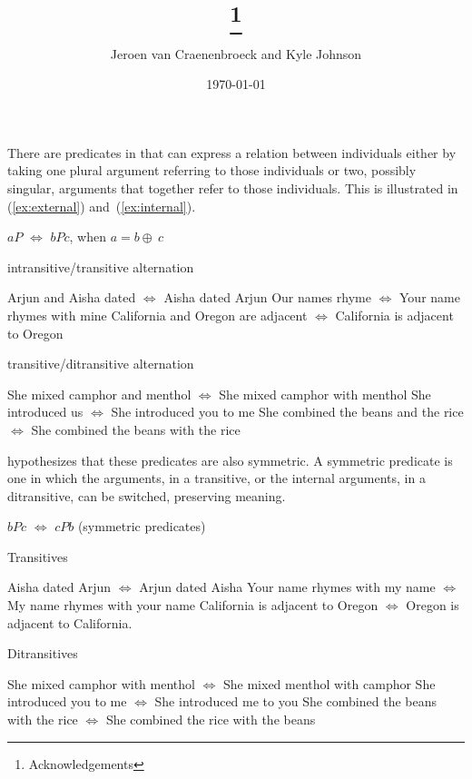 \documentclass[twoside, 12pt]{article}
\title{\paper\thanks{Acknowledgements}}
\author{Jeroen van Craenenbroeck and Kyle Johnson}
\date{\today}
\begin{document}
\begin{titlepage} 
\maketitle 
\thispagestyle{empty}
\begin{abstract}

 \noindent 
 
 \end{abstract}
 \end{titlepage} 

\thispagestyle{empty}
\noindent
There are predicates in that can express a relation between individuals either by taking one plural argument referring to those individuals or two, possibly singular, arguments that together refer to those individuals. This is illustrated in (\ref{ex:external}) and~(\ref{ex:internal}).
\begin{exe}
\raggedright
\ex \label{ex:plainsymm} $aP$ $\Leftrightarrow$ $bPc$, when $a = b \oplus\ c$
\begin{xlist}
  \ex \label{ex:external} intransitive/transitive alternation
  \begin{xlist}
    \ex Arjun and Aisha dated $\Leftrightarrow$ Aisha dated Arjun
    \ex Our names rhyme $\Leftrightarrow$ Your name rhymes with mine
    \ex California and Oregon are adjacent $\Leftrightarrow$ California is adjacent to Oregon
  \end{xlist}
  \ex \label{ex:internal} transitive/ditransitive alternation
  \begin{xlist}
    \ex She mixed camphor and menthol $\Leftrightarrow$ She mixed camphor with menthol
    \ex She introduced us $\Leftrightarrow$ She introduced you to me
    \ex She combined the beans and the rice $\Leftrightarrow$ She combined the beans with the rice
  \end{xlist}
\end{xlist}
\end{exe}
\citet{Winter:2018} hypothesizes that these predicates are also symmetric. A symmetric predicate is one in which the arguments, in a transitive, or the internal arguments, in a ditransitive, can be switched, preserving meaning.
\begin{exe}
\raggedright
  \ex \label{ex:symm} $bPc$ $\Leftrightarrow$ $cPb$ (symmetric predicates)
  \begin{xlist}
  \ex \label{ex:symmtrans} Transitives
  \begin{xlist}
    \ex Aisha dated Arjun $\Leftrightarrow$ Arjun dated Aisha
    \ex Your name rhymes with my name $\Leftrightarrow$ My name rhymes with your name
    \ex California is adjacent to Oregon $\Leftrightarrow$ Oregon is adjacent to California.
  \end{xlist}
  \ex Ditransitives
  \begin{xlist}
    \ex She mixed camphor with menthol $\Leftrightarrow$ She mixed menthol with camphor 
    \ex She introduced you to me $\Leftrightarrow$ She introduced me to you
    \ex She combined the beans with the rice $\Leftrightarrow$ She combined the rice with the beans
  \end{xlist}
\end{xlist}
\end{exe}
\end{document}
